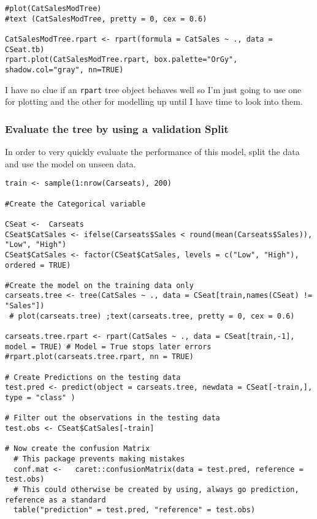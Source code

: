 \documentclass[
]{article}
\newcommand{\passthrough}[1]{#1}
\begin{document}
\begin{lstlisting}
#plot(CatSalesModTree)
#text (CatSalesModTree, pretty = 0, cex = 0.6)

CatSalesModTree.rpart <- rpart(formula = CatSales ~ ., data = CSeat.tb)
rpart.plot(CatSalesModTree.rpart, box.palette="OrGy", shadow.col="gray", nn=TRUE)
\end{lstlisting}

I have no clue if an \passthrough{\lstinline!rpart!} tree object behaves
well so I'm just going to use one for plotting and the other for
modelling up until I have time to look into them.

\hypertarget{evaluate-the-tree-by-using-a-validation-split}{%
\subsubsection{Evaluate the tree by using a validation
Split}\label{evaluate-the-tree-by-using-a-validation-split}}

In order to very quickly evaluate the performance of this model, split
the data and use the model on unseen data.

\begin{lstlisting}
train <- sample(1:nrow(Carseats), 200)

#Create the Categorical variable

CSeat <-  Carseats
CSeat$CatSales <- ifelse(Carseats$Sales < round(mean(Carseats$Sales)), "Low", "High")
CSeat$CatSales <- factor(CSeat$CatSales, levels = c("Low", "High"), ordered = TRUE)

#Create the model on the training data only
carseats.tree <- tree(CatSales ~ ., data = CSeat[train,names(CSeat) != "Sales"])
 # plot(carseats.tree) ;text(carseats.tree, pretty = 0, cex = 0.6)

carseats.tree.rpart <- rpart(CatSales ~ ., data = CSeat[train,-1], model = TRUE) # Model = True stops later errors
#rpart.plot(carseats.tree.rpart, nn = TRUE)

# Create Predictions on the testing data
test.pred <- predict(object = carseats.tree, newdata = CSeat[-train,], type = "class" )

# Filter out the observations in the testing data
test.obs <- CSeat$CatSales[-train]

# Now create the confusion Matrix
  # This package prevents making mistakes
  conf.mat <-   caret::confusionMatrix(data = test.pred, reference = test.obs)
  # This could otherwise be created by using, always go prediction, reference as a standard
  table("prediction" = test.pred, "reference" = test.obs)
  
\end{lstlisting}
\end{document}
